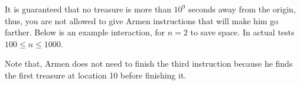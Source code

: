 It is guaranteed that no treasure is more than $10^9$ seconds away from the origin, thus, you are not allowed to give Armen instructions that will make him go farther.
Below is an example interaction, for $n = 2$ to save space.
In actual tests $100 \leq n \leq 1000$.

{
\renewcommand{\sampleinputname}{Armen's feedback}
\renewcommand{\sampleoutputname}{Your instructions}
}

Note that, Armen does not need to finish the third instruction because he finds the first treasure at location 10 before finishing it.

